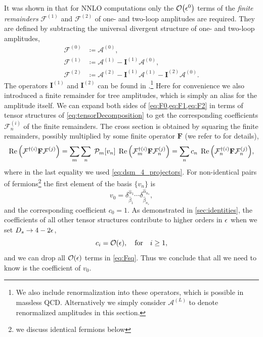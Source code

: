 It was shown in \cite{Weinzierl:2011uz} that for NNLO computations only the $\order{\eps^0}$ terms of the 
\emph{finite remainders} $\mathcal{F}^{(1)}$ and $\mathcal{F}^{(2)}$ of one- and two-loop amplitudes are required.
They are defined by subtracting the universal divergent structure of one- and two-loop amplitudes, 
\begin{subequations}
  \begin{align}
    \label{eq:F0}
    \mathcal{F}^{(0)} &\coloneqq \mathcal{A}^{(0)}, \\ 
     \label{eq:F1}
    \mathcal{F}^{(1)} &\coloneqq \mathcal{A}^{(1)} - \mathbf{I}^{(1)} \mathcal{A}^{(0)}, \\ 
     \label{eq:F2}
    \mathcal{F}^{(2)} &\coloneqq \mathcal{A}^{(2)}  - \mathbf{I}^{(1)} \mathcal{A}^{(1)} - \mathbf{I}^{(2)} \mathcal{A}^{(0)}.
  \end{align}
\end{subequations}
The operators $\mathbf{I}^{(1)}$ and $\mathbf{I}^{(2)}$ can be found in \cite{Catani:1998bh,Sterman:2002qn,Becher:2009cu,Gardi:2009qi}.\footnote{
  We also include renormalization into these operators, which is possible in massless QCD.
  Alternatively we simply consider $\mathcal{A}^{(L)}$ to denote renormalized amplitudes in this section.
}
Here for convenience we also introduced a finite remainder for tree amplitudes, which is simply an alias for the amplitude itself.
We can expand both sides of \cref{eq:F0,eq:F1,eq:F2} in terms of tensor structures of \cref{eq:tensorDecomposition}
to get the corresponding coefficients $\mathcal{F}^{(i)}_n$ of the finite remainders.
The cross section is obtained by squaring the finite remainders, possibly multiplied by some
finite operator $\mathbf{F}$ (we refer to \cite{Weinzierl:2011uz} for details),
\begin{equation} \label{eq:Fsq}
  \Re\qty(\mathcal{F}^{\dagger(i)}\mathbf{F}\mathcal{F}^{(j)}) = \sum_m\sum_n\; \mathcal{P}_m \qty[v_n]  \; \Re\qty(\mathcal{F}^{\dagger(i)}_m\mathbf{F}\mathcal{F}^{(j)}_n) = 
     \sum_n c_n \; \Re\qty(\mathcal{F}^{\dagger(i)}_n\mathbf{F}\mathcal{F}^{(j)}_n),
\end{equation}
where in the last equality we used \cref{eq:dsm_4_projectors}.
For non-identical pairs of fermions\footnote{we discuss identical fermions below} 
the first element of the basis $\{v_n\}$ is
\begin{equation}
  v_0  = \delta^{\hat{\alpha}_1}_{\hat{\beta}_1}\cdots \delta^{\hat{\alpha}_{n_s}}_{\hat{\beta}_{n_s}},
\end{equation}
and the corresponding coefficient $c_0 = 1$.
As demonstrated in \cref{sec:identities}, the coefficients of all other tensor structures
contribute to higher orders in $\epsilon$ when we set $D_s\to 4-2\epsilon$,
\begin{equation}
  c_i=\order{\eps}, \qfor i\geq 1,
\end{equation}
and we can drop all $\order{\eps}$ terms in \cref{eq:Fsq}.
Thus we conclude that all we need to know is the coefficient of $v_0$.


